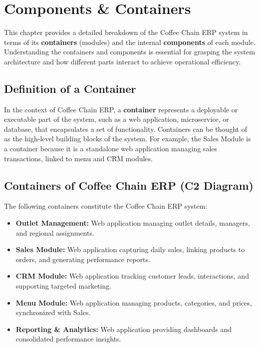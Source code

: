 \chapter{Components \& Containers}

This chapter provides a detailed breakdown of the Coffee Chain ERP system in terms of its \textbf{containers} (modules) and the internal \textbf{components} of each module. Understanding the containers and components is essential for grasping the system architecture and how different parts interact to achieve operational efficiency.

\section*{Definition of a Container}

In the context of Coffee Chain ERP, a \textbf{container} represents a deployable or executable part of the system, such as a web application, microservice, or database, that encapsulates a set of functionality. Containers can be thought of as the high-level building blocks of the system. For example, the Sales Module is a container because it is a standalone web application managing sales transactions, linked to menu and CRM modules.

\section*{Containers of Coffee Chain ERP (C2 Diagram)}

The following containers constitute the Coffee Chain ERP system:

\begin{itemize}
    \item \textbf{Outlet Management:} Web application managing outlet details, managers, and regional assignments.
    \item \textbf{Sales Module:} Web application capturing daily sales, linking products to orders, and generating performance reports.
    \item \textbf{CRM Module:} Web application tracking customer leads, interactions, and supporting targeted marketing.
    \item \textbf{Menu Module:} Web application managing products, categories, and prices, synchronized with Sales.
    \item \textbf{Reporting \& Analytics:} Web application providing dashboards and consolidated performance insights.
\end{itemize}

